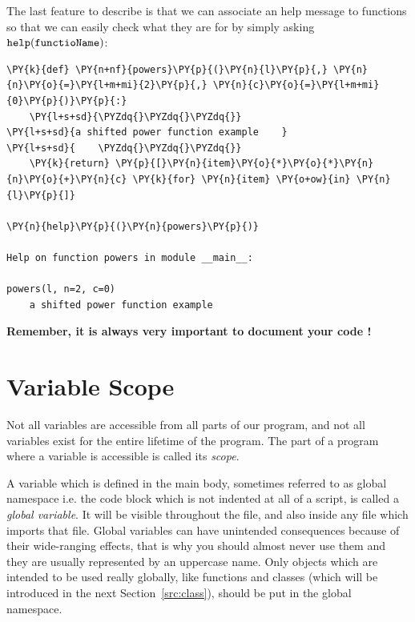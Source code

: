 The last feature to describe is that we can associate an help message to functions so that 
we can easily check what they are for by simply asking $\tt{help(functioName)}$:

\begin{codebox}[breakable, size=fbox, boxrule=1pt, pad at break*=1mm,colback=cellbackground, colframe=cellborder]
\begin{Verbatim}[commandchars=\\\{\}]
\PY{k}{def} \PY{n+nf}{powers}\PY{p}{(}\PY{n}{l}\PY{p}{,} \PY{n}{n}\PY{o}{=}\PY{l+m+mi}{2}\PY{p}{,} \PY{n}{c}\PY{o}{=}\PY{l+m+mi}{0}\PY{p}{)}\PY{p}{:}
    \PY{l+s+sd}{\PYZdq{}\PYZdq{}\PYZdq{}}
\PY{l+s+sd}{a shifted power function example    }
\PY{l+s+sd}{    \PYZdq{}\PYZdq{}\PYZdq{}}
    \PY{k}{return} \PY{p}{[}\PY{n}{item}\PY{o}{*}\PY{o}{*}\PY{n}{n}\PY{o}{+}\PY{n}{c} \PY{k}{for} \PY{n}{item} \PY{o+ow}{in} \PY{n}{l}\PY{p}{]}

\PY{n}{help}\PY{p}{(}\PY{n}{powers}\PY{p}{)}

Help on function powers in module __main__:

powers(l, n=2, c=0)
    a shifted power function example
\end{Verbatim}
\end{codebox}

\textbf{Remember, it is always very important to document your code !}

\section{Variable Scope}
\label{sec:var_scope}

Not all variables are accessible from all parts of our program, and not all variables 
exist for the entire lifetime of the program. The part of a program where a variable 
is accessible is called its \emph{scope}.

A variable which is defined in the main body, sometimes referred to as global namespace 
i.e. the code block which is not indented at all of a script, is called a \emph{global variable}. 
It will be visible throughout the file, and also inside any file which imports that file. 
Global variables can have unintended consequences because of their wide-ranging effects, 
that is why you should almost never use them and they are usually represented by an uppercase name. 
Only objects which are intended to be used really globally, like functions and classes 
(which will be introduced in the next Section~\ref{src:class}), should be put in the global namespace.

